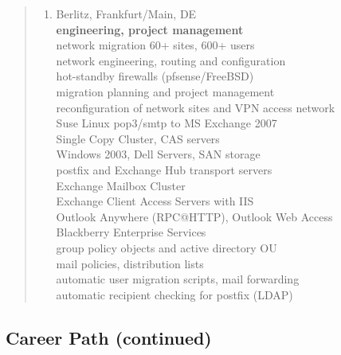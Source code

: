 \documentclass[a4paper]{report}
\begin{document}
\begin{quote}
\begin{enumerate}
\item[2007 - 2008]  Berlitz, Frankfurt/Main, DE\\
                    \textbf{engineering, project management}\\
                    network migration 60+ sites, 600+ users\\
                    network engineering, routing and configuration\\
                    hot-standby firewalls (pfsense/FreeBSD)\\
                    migration planning and project management\\
                    reconfiguration of network sites and VPN access network\\
                    Suse Linux pop3/smtp to MS Exchange 2007\\
                    Single Copy Cluster, CAS servers\\
                    Windows 2003, Dell Servers, SAN storage\\
                    postfix and Exchange Hub transport servers\\
                    Exchange Mailbox Cluster\\
                    Exchange Client Access Servers with IIS\\
                    Outlook Anywhere (RPC@HTTP), Outlook Web Access\\
                    Blackberry Enterprise Services\\
                    group policy objects and active directory OU\\
                    mail policies, distribution lists\\
                    automatic user migration scripts, mail forwarding\\
                    automatic recipient checking for postfix (LDAP)

\end{enumerate}
\end{quote}

\clearpage

\begin{flushleft}
\section*{Career Path (continued)}
\end{flushleft}
\end{document}
